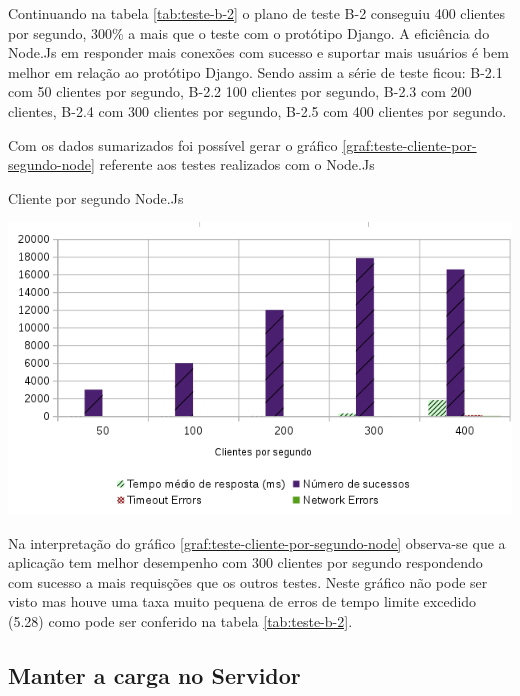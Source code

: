   Continuando na tabela \ref{tab:teste-b-2} o plano de teste B-2 conseguiu 400 clientes por segundo, 300\% a mais que o teste 
  com o protótipo Django. A eficiência do Node.Js em responder mais conexões com sucesso e suportar
  mais usuários é bem melhor em relação ao protótipo Django. Sendo assim a série de teste ficou: B-2.1 com 50 clientes por segundo, 
  B-2.2 100 clientes por segundo,  B-2.3 com 200 clientes, B-2.4 com 300 clientes por segundo, B-2.5 com 400 clientes por segundo.
  
  Com os dados sumarizados foi possível gerar o gráfico \ref{graf:teste-cliente-por-segundo-node} referente aos testes 
  realizados com o Node.Js

  \begin{grafico}[H]
    \setlength{\abovecaptionskip}{5pt}
    \setlength{\belowcaptionskip}{0pt}
    \label{graf:teste-cliente-por-segundo-node}
    \caption[Cliente por segundo Node.Js]
	    {Cliente por segundo Node.Js}
    \centering
    \includegraphics[width=.80\textwidth]{imagem/graficos/grafico_node_plano_de_teste_2.png}
    \captionsetup[grafico]{justification=centering}
  \end{grafico}
  
  Na interpretação do gráfico \ref{graf:teste-cliente-por-segundo-node} observa-se que a aplicação tem melhor desempenho
  com 300 clientes por segundo respondendo com sucesso a mais requisções que os outros testes. Neste gráfico não pode
  ser visto mas houve uma taxa muito pequena de erros de tempo limite excedido (5.28) como pode ser conferido na tabela
  \ref{tab:teste-b-2}.
  

    
\subsection{Manter a carga no Servidor}  

